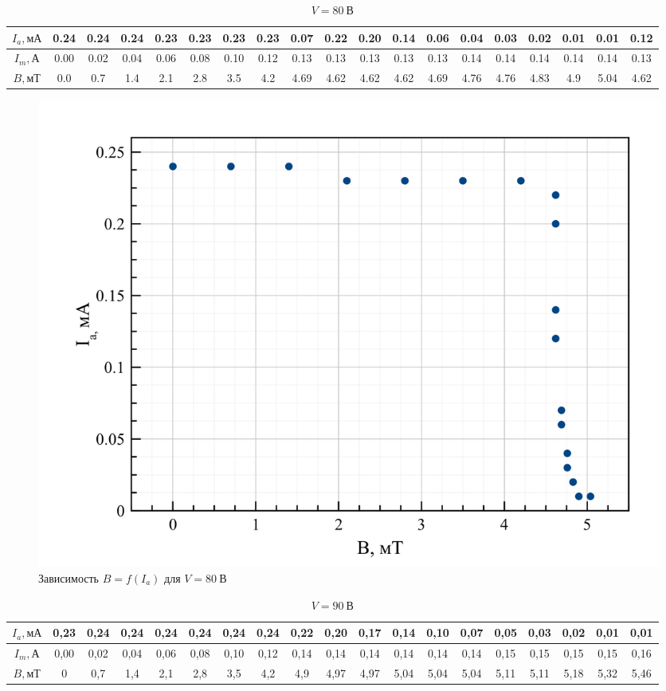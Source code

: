 \documentclass[a4paper, 12pt]{article}
\begin{document}
\begin{table}[H]
\centering
\caption{$V = 80 \: \text{В}$}
\begin{adjustbox}{max width=\textwidth}
\begin{tabular}{|c|c|c|c|c|c|c|c|c|c|c|c|c|c|c|c|c|c|c|}
\hline
$I_a, \text{мА}$ & 0.24 & 0.24 & 0.24 & 0.23 & 0.23 & 0.23 & 0.23 & 0.07 & 0.22 & 0.20 & 0.14 & 0.06 & 0.04 & 0.03 & 0.02 & 0.01 & 0.01 & 0.12 \\ \hline
$I_m, \text{А}$  & 0.00 & 0.02 & 0.04 & 0.06 & 0.08 & 0.10 & 0.12 & 0.13 & 0.13 & 0.13 & 0.13 & 0.13 & 0.14 & 0.14 & 0.14 & 0.14 & 0.14 & 0.13 \\ \hline
$B, \text{мТ}$    & 0.0  & 0.7  & 1.4  & 2.1  & 2.8  & 3.5  & 4.2  & 4.69 & 4.62 & 4.62 & 4.62 & 4.69 & 4.76 & 4.76 & 4.83 & 4.9  & 5.04 & 4.62 \\ \hline
\end{tabular}
\end{adjustbox}
\end{table}

\begin{figure}[H]
\centering
	 \includegraphics[width = 0.6 \textwidth]{80V}
\caption{Зависимость $B = f(I_a)$ для $V = 80\: \text{В}$}
\end{figure}

\begin{table}[H]
\centering
\caption{$V = 90 \: \text{В}$}
\begin{adjustbox}{max width=\textwidth}
\begin{tabular}{|c|c|c|c|c|c|c|c|c|c|c|c|c|c|c|c|c|c|c|}
\hline
$I_a, \text{мА}$ & 0,23 & 0,24 & 0,24 & 0,24 & 0,24 & 0,24 & 0,24 & 0,22 & 0,20 & 0,17 & 0,14 & 0,10 & 0,07 & 0,05 & 0,03 & 0,02 & 0,01 & 0,01 \\ \hline
$I_m, \text{А}$  & 0,00 & 0,02 & 0,04 & 0,06 & 0,08 & 0,10 & 0,12 & 0,14 & 0,14 & 0,14 & 0,14 & 0,14 & 0,14 & 0,15 & 0,15 & 0,15 & 0,15 & 0,16 \\ \hline
$B,\text{мТ}$    & 0    & 0,7  & 1,4  & 2,1  & 2,8  & 3,5  & 4,2  & 4,9  & 4,97 & 4,97 & 5,04 & 5,04 & 5,04 & 5,11 & 5,11 & 5,18 & 5,32 & 5,46 \\ \hline
\end{tabular}
\end{adjustbox}
\end{table}
\end{document}
